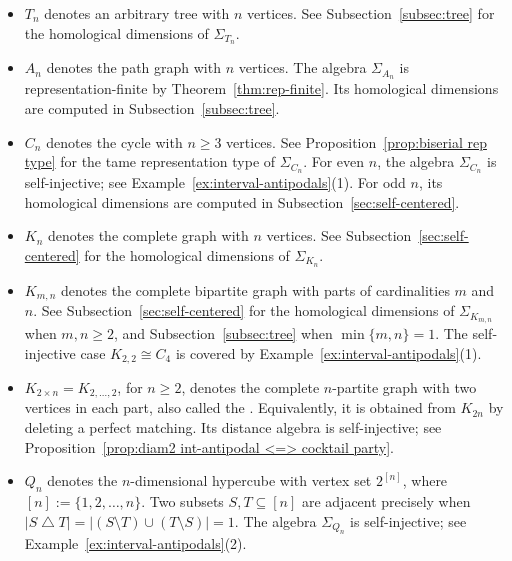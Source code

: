 \documentclass[a4paper,leqno]{amsart}
\begin{document}
\begin{itemize}
    \item $T_n$ denotes an arbitrary tree with $n$ vertices.
    See Subsection~\ref{subsec:tree} for the homological dimensions
    of $\Sigma_{T_n}$.

    \item $A_n$ denotes the path graph with $n$ vertices.
    The algebra $\Sigma_{A_n}$ is representation-finite by
    Theorem~\ref{thm:rep-finite}.
    Its homological dimensions are computed in
    Subsection~\ref{subsec:tree}.

    \item $C_n$ denotes the cycle with $n\geq3$ vertices.
    See Proposition~\ref{prop:biserial rep type} for the tame
    representation type of $\Sigma_{C_n}$.
    For even $n$, the algebra $\Sigma_{C_n}$ is self-injective;
    see Example~\ref{ex:interval-antipodals}(1).
    For odd $n$, its homological dimensions are computed in
    Subsection~\ref{sec:self-centered}.

    \item $K_n$ denotes the complete graph with $n$ vertices.
    See Subsection~\ref{sec:self-centered} for the homological
    dimensions of $\Sigma_{K_n}$.

    \item $K_{m,n}$ denotes the complete bipartite graph with parts
    of cardinalities $m$ and $n$.
    See Subsection~\ref{sec:self-centered} for the homological
    dimensions of $\Sigma_{K_{m,n}}$ when $m,n\geq2$, and
    Subsection~\ref{subsec:tree} when $\min\{m,n\}=1$.
    The self-injective case $K_{2,2}\cong C_4$ is covered by     Example~\ref{ex:interval-antipodals}(1).

    \item
    $K_{2\times n}=
    K_{{2,\ldots,2}}$, for $n\geq2$,
    denotes the complete $n$-partite graph with two vertices in
    each part, also called the .
    Equivalently, it is obtained from $K_{2n}$ by deleting a
    perfect matching.
    Its distance algebra is self-injective; see
    Proposition~\ref{prop:diam2 int-antipodal <=> cocktail party}.

    \item $Q_n$ denotes the $n$-dimensional hypercube with vertex
    set $2^{[n]}$, where $[n]:=\{1,2,\ldots,n\}$.
    Two subsets $S,T\subseteq[n]$ are adjacent precisely when
    $|S\mathbin{\triangle}T|=|(S\setminus T)\cup(T\setminus S)|=1$.
    The algebra $\Sigma_{Q_n}$ is self-injective; see
    Example~\ref{ex:interval-antipodals}(2).


\end{itemize}
\end{document}

